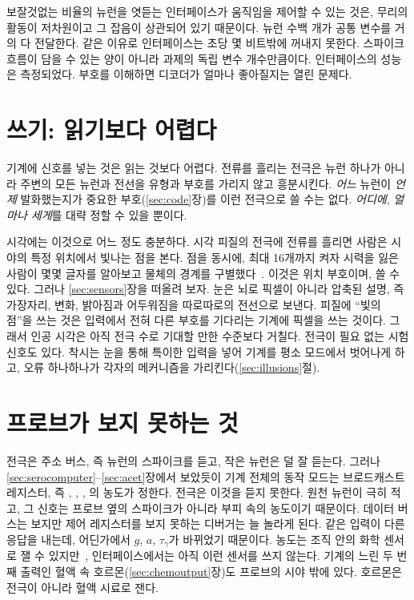\begin{keyblock}
\begin{proposition}
\label{prop:probe}
보잘것없는 비율의 뉴런을 엿듣는 인터페이스가 움직임을 제어할 수 있는 것은, 무리의 활동이 저차원이고 그 잡음이 상관되어 있기 때문이다. 뉴런 수백 개가 공통 변수를 거의 다 전달한다. 같은 이유로 인터페이스는 초당 몇 비트밖에 꺼내지 못한다. 스파이크 흐름이 담을 수 있는 양이 아니라 과제의 독립 변수 개수만큼이다. 인터페이스의 성능은 측정되었다. 부호를 이해하면 디코더가 얼마나 좋아질지는 열린 문제다.
\end{proposition}
\end{keyblock}

\section{쓰기: 읽기보다 어렵다}

기계에 신호를 넣는 것은 읽는 것보다 어렵다. 전류를 흘리는 전극은 뉴런 하나가 아니라 주변의 모든 뉴런과 전선을 유형과 부호를 가리지 않고 흥분시킨다. \emph{어느} 뉴런이 \emph{언제} 발화했는지가 중요한 부호(\ref{sec:code}장)를 이런 전극으로 쓸 수는 없다. \emph{어디에}, \emph{얼마나 세게}를 대략 정할 수 있을 뿐이다.

시각에는 이것으로 어느 정도 충분하다. 시각 피질의 전극에 전류를 흘리면 사람은 시야의 특정 위치에서 빛나는 점을 본다. 점을 동시에, 최대 16개까지 켜자 시력을 잃은 사람이 몇몇 글자를 알아보고 물체의 경계를 구별했다~\cite{Fernandez2021}. 이것은 위치 부호이며, 쓸 수 있다. 그러나 \ref{sec:sensors}장을 떠올려 보자. 눈은 뇌로 픽셀이 아니라 압축된 설명, 즉 가장자리, 변화, 밝아짐과 어두워짐을 따로따로의 전선으로 보낸다. 피질에 “빛의 점”을 쓰는 것은 입력에서 전혀 다른 부호를 기다리는 기계에 픽셀을 쓰는 것이다. 그래서 인공 시각은 아직 전극 수로 기대할 만한 수준보다 거칠다. 전극이 필요 없는 시험 신호도 있다. 착시는 눈을 통해 특이한 입력을 넣어 기계를 평소 모드에서 벗어나게 하고, 오류 하나하나가 각자의 메커니즘을 가리킨다(\ref{sec:illusions}절).

\section{프로브가 보지 못하는 것}

전극은 주소 버스, 즉  뉴런의 스파이크를 듣고, 작은  뉴런은 덜 잘 듣는다. 그러나 \ref{sec:serocomputer}--\ref{sec:acet}장에서 보았듯이 기계 전체의 동작 모드는 브로드캐스트 레지스터, 즉 , , , 의 농도가 정한다. 전극은 이것을 듣지 못한다. 원천 뉴런이 극히 적고, 그 신호는 프로브 옆의 스파이크가 아니라 부피 속의 농도이기 때문이다. 데이터 버스는 보지만 제어 레지스터를 보지 못하는 디버거는 늘 놀라게 된다. 같은 입력이 다른 응답을 내는데, 어딘가에서 $g$, $a$, $\tau_\gamma$가 바뀌었기 때문이다. 농도는 조직 안의 화학 센서로 잴 수 있지만~\cite{Bunin1998}, 인터페이스에서는 아직 이런 센서를 쓰지 않는다. 기계의 느린 두 번째 출력인 혈액 속 호르몬(\ref{sec:chemoutput}장)도 프로브의 시야 밖에 있다. 호르몬은 전극이 아니라 혈액 시료로 잰다.

